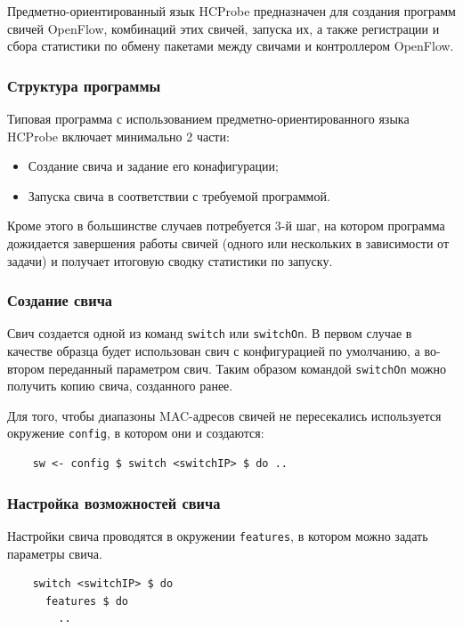 \documentclass[9pt,a4paper]{article}
\begin{document}
Предметно-ориентированный язык HCProbe предназначен для создания программ свичей OpenFlow,
комбинаций этих свичей, запуска их, а также регистрации и сбора статистики по обмену
пакетами между свичами и контроллером OpenFlow.

\subsubsection{Структура программы}

Типовая программа с использованием предметно-ориентированного языка HCProbe включает
минимально 2 части:

\begin{itemize}
  \item Создание свича и задание его конафигурации;
  \item Запуска свича в соответствии с требуемой программой.
\end{itemize}

Кроме этого в большинстве случаев потребуется 3-й шаг, на котором программа дожидается
завершения работы свичей (одного или нескольких в зависимости от задачи) и получает
итоговую сводку статистики по запуску.

\subsubsection{Создание свича}

Свич создается одной из команд \lstinline!switch! или \lstinline!switchOn!. В первом случае
в качестве образца будет использован свич с конфигурацией по умолчанию, а во-втором 
переданный параметром свич. Таким образом командой \lstinline!switchOn! можно получить
копию свича, созданного ранее.

Для того, чтобы диапазоны MAC-адресов свичей не пересекались используется окружение
\lstinline!config!, в котором они и создаются:

\begin{lstlisting}
    sw <- config $ switch <switchIP> $ do ..
\end{lstlisting}%

\subsubsection{Настройка возможностей свича}

Настройки свича проводятся в окружении \lstinline!features!, в котором можно задать
параметры свича.

\begin{lstlisting}
    switch <switchIP> $ do
      features $ do
        ..
\end{lstlisting}
\end{document}
